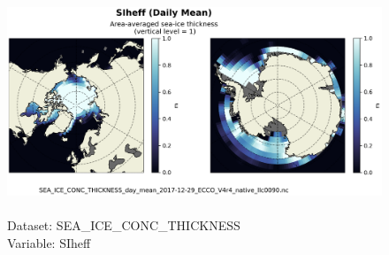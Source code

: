 \begin{figure}[H]
\centering
\includegraphics[scale=0.5]{../images/plots/native_plots/Sea-Ice_and_Snow_Concentration_and_Thickness/SIheff.png}
\caption{\\Dataset: SEA\_ICE\_CONC\_THICKNESS\\Variable: SIheff}
\label{tab:table-SEA_ICE_CONC_THICKNESS_SIheff-Plot}
\end{figure}
\pagebreak
